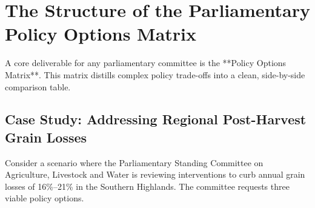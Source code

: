 \documentclass[11pt, a4paper]{report}
\begin{document}
\newpage

\section{The Structure of the Parliamentary Policy Options Matrix}
A core deliverable for any parliamentary committee is the **Policy Options Matrix**. This matrix distills complex policy trade-offs into a clean, side-by-side comparison table.

\subsection{Case Study: Addressing Regional Post-Harvest Grain Losses}
Consider a scenario where the Parliamentary Standing Committee on Agriculture, Livestock and Water is reviewing interventions to curb annual grain losses of 16\%--21\% in the Southern Highlands. The committee requests three viable policy options.
\end{document}
